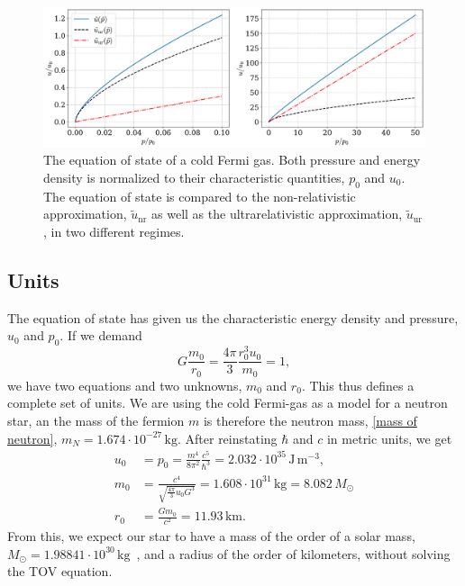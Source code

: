 \begin{figure}[h]
    \centering
    \includegraphics[width=\textwidth]{../scripts/figurer/fermi_eos.pdf}
    \caption{The equation of state of a cold Fermi gas. Both pressure and energy density is normalized to their characteristic quantities, $p_0$ and $u_0$. The equation of state is compared to the non-relativistic approximation, $\tilde u_{\mathrm{nr}}$ as well as the ultrarelativistic approximation, $\tilde u_{\mathrm{ur}}$, in two different regimes.}
    \label{fig: equation of state fermi fluid}
\end{figure}



\subsection{Units}

The equation of state has given us the characteristic energy density and pressure, $u_0$ and $p_0$. 
If we demand
%
\begin{equation}
    G \frac{m_0}{r_0} = \frac{4 \pi }{3}\frac{r_0^3 u_0}{m_0} = 1,
\end{equation}
%
we have two equations and two unknowns, $m_0$ and $r_0$.
This thus defines a complete set of units.
We are using the cold Fermi-gas as a model for a neutron star, an the mass of the fermion $m$ is therefore the neutron mass, \autoref{mass of neutron}, $m_N = 1.674 \cdot 10^{-27} \, \text{kg}$.
After reinstating $\hbar$ and $c$ in metric units, we get
%
\begin{align}
    u_0 &= p_0 = \frac{m^4}{8 \pi^2}\frac{c^5}{\hbar^3} 
    = 2.032\cdot10^{35}  \, \text{J}\,\text{m}^{-3}, \\
    m_0 &= \frac{c^4}{\sqrt{\frac{4 \pi}{3} u_0 G^3} }
    = 1.608 \cdot 10^{31} \, \text{kg}
    = 8.082 \, M_\odot \\
    r_0 &= \frac{G m_0}{c^2} = 11.93 \, \text{km}. %
\end{align}
%
From this, we expect our star to have a mass of the order of a solar mass, $M_\odot = 1.988 41\cdot 10^{30}\, \text{kg}$~\autocite{particledatagroupReviewParticlePhysics2020}, and a radius of the order of kilometers, without solving the TOV equation.



